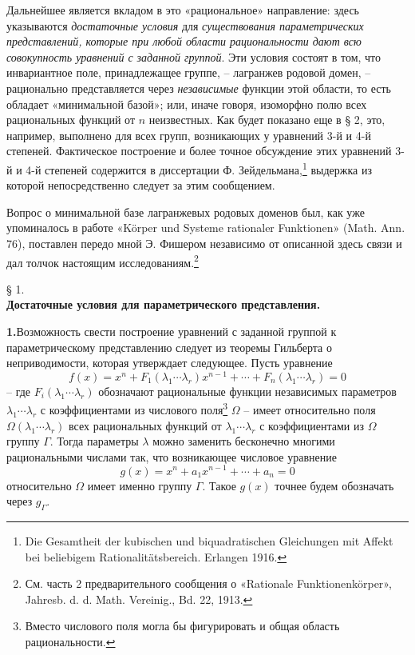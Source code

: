 \documentclass[11pt]{article}
\begin{document}
Дальнейшее является вкладом в это «рациональное» направление: здесь указываются \emph{достаточные условия} для \emph{существования параметрических представлений, которые при любой области рациональности дают всю совокупность уравнений с заданной группой}. Эти условия состоят в том, что инвариантное поле, принадлежащее группе, -- лагранжев родовой домен, -- рационально представляется через \emph{независимые} функции этой области, то есть обладает «минимальной базой»; или, иначе говоря, изоморфно полю всех рациональных функций от $n$ неизвестных. Как будет показано еще в § 2, это, например, выполнено для всех групп, возникающих у уравнений 3-й и 4-й степеней. Фактическое построение и более точное обсуждение этих уравнений 3-й и 4-й степеней содержится в диссертации Ф. Зейдельмана,\footnote{Die Gesamtheit der kubischen und biquadratischen Gleichungen mit Affekt bei beliebigem Rationalitätsbereich. Erlangen 1916.} выдержка из которой непосредственно следует за этим сообщением.

Вопрос о минимальной базе лагранжевых родовых доменов был, как уже упоминалось в работе «Körper und Systeme rationaler Funktionen» (Math. Ann. 76), поставлен передо мной Э. Фишером независимо от описанной здесь связи и дал толчок настоящим исследованиям.\footnote{См. часть 2 предварительного сообщения о «Rationale Funktionenkörper», Jahresb. d. d. Math. Vereinig., Bd. 22, 1913.}

\begin{center}
§ 1.\\[0.75\baselineskip]
\textbf{Достаточные условия для параметрического представления.}
\end{center}

\noindent\textbf{1.}\quad Возможность свести построение уравнений с заданной группой к параметрическому представлению следует из теоремы Гильберта о неприводимости, которая утверждает следующее. Пусть уравнение
\begin{equation}
 f(x)=x^n+F_1(\lambda_1\cdots\lambda_r)x^{n-1}+\cdots+F_n(\lambda_1\cdots\lambda_r)=0
\tag{1}
\end{equation}
-- где $F_i(\lambda_1\cdots\lambda_r)$ обозначают рациональные функции независимых параметров $\lambda_1\cdots\lambda_r$ с коэффициентами из числового поля\footnote{Вместо числового поля могла бы фигурировать и общая область рациональности.} $\Omega$ -- имеет относительно поля $\Omega(\lambda_1\cdots\lambda_r)$ всех рациональных функций от $\lambda_1\cdots\lambda_r$ с коэффициентами из $\Omega$ группу $\Gamma$. Тогда параметры $\lambda$ можно заменить бесконечно многими рациональными числами так, что возникающее числовое уравнение
\begin{equation}
 g(x)=x^n+a_1x^{n-1}+\cdots+a_n=0
\tag{2}
\end{equation}
относительно $\Omega$ имеет именно группу $\Gamma$. Такое $g(x)$ точнее будем обозначать через $g_\Gamma$.
\end{document}
